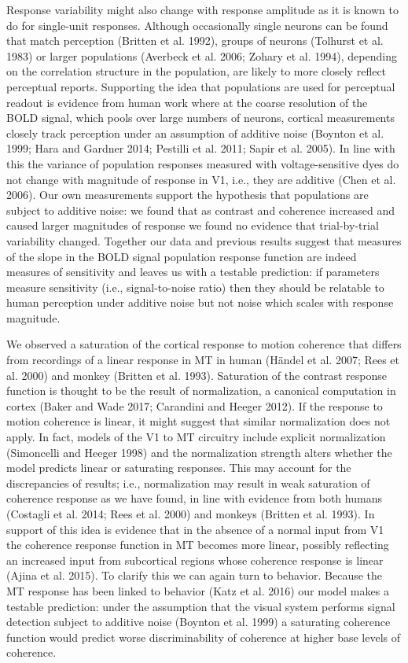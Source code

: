 \documentclass{report}
\begin{document}
Response variability might also change with response amplitude as it is known to do for single-unit responses. Although occasionally single neurons can be found that match perception (Britten et al. 1992), groups of neurons (Tolhurst et al. 1983) or larger populations (Averbeck et al. 2006; Zohary et al. 1994), depending on the correlation structure in the population, are likely to more closely reflect perceptual reports. Supporting the idea that populations are used for perceptual readout is evidence from human work where at the coarse resolution of the BOLD signal, which pools over large numbers of neurons, cortical measurements closely track perception under an assumption of additive noise (Boynton et al. 1999; Hara and Gardner 2014; Pestilli et al. 2011; Sapir et al. 2005). In line with this the variance of population responses measured with voltage-sensitive dyes do not change with magnitude of response in V1, i.e., they are additive (Chen et al. 2006). Our own measurements support the hypothesis that populations are subject to additive noise: we found that as contrast and coherence increased and caused larger magnitudes of response we found no evidence that trial-by-trial variability changed. Together our data and previous results suggest that measures of the slope in the BOLD signal population response function are indeed measures of sensitivity and leaves us with a testable prediction: if parameters measure sensitivity (i.e., signal-to-noise ratio) then they should be relatable to human perception under additive noise but not noise which scales with response magnitude.

We observed a saturation of the cortical response to motion coherence that differs from recordings of a linear response in MT in human (Händel et al. 2007; Rees et al. 2000) and monkey (Britten et al. 1993). Saturation of the contrast response function is thought to be the result of normalization, a canonical computation in cortex (Baker and Wade 2017; Carandini and Heeger 2012). If the response to motion coherence is linear, it might suggest that similar normalization does not apply. In fact, models of the V1 to MT circuitry include explicit normalization (Simoncelli and Heeger 1998) and the normalization strength alters whether the model predicts linear or saturating responses. This may account for the discrepancies of results; i.e., normalization may result in weak saturation of coherence response as we have found, in line with evidence from both humans (Costagli et al. 2014; Rees et al. 2000) and monkeys (Britten et al. 1993). In support of this idea is evidence that in the absence of a normal input from V1 the coherence response function in MT becomes more linear, possibly reflecting an increased input from subcortical regions whose coherence response is linear (Ajina et al. 2015). To clarify this we can again turn to behavior. Because the MT response has been linked to behavior (Katz et al. 2016) our model makes a testable prediction: under the assumption that the visual system performs signal detection subject to additive noise (Boynton et al. 1999) a saturating coherence function would predict worse discriminability of coherence at higher base levels of coherence.
\end{document}
